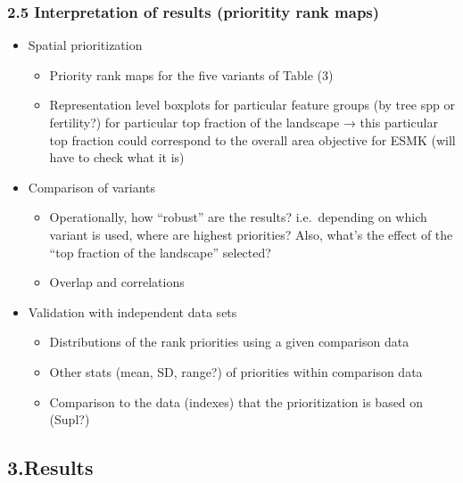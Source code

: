 \documentclass[]{article}
\begin{document}
\subsubsection{2.5 Interpretation of results (prioritity rank maps)}

\begin{itemize}
\itemsep1pt\parskip0pt
\item
  Spatial prioritization

  \begin{itemize}
  \itemsep1pt\parskip0pt
  \item
    Priority rank maps for the five variants of Table (3)
  \item
    Representation level boxplots for particular feature groups (by tree
    spp or fertility?) for particular top fraction of the landscape →
    this particular top fraction could correspond to the overall area
    objective for ESMK (will have to check what it is)
  \end{itemize}
\item
  Comparison of variants

  \begin{itemize}
  \itemsep1pt\parskip0pt
  \item
    Operationally, how ``robust'' are the results? i.e.~depending on
    which variant is used, where are highest priorities? Also, what's
    the effect of the ``top fraction of the landscape'' selected?
  \item
    Overlap and correlations
  \end{itemize}
\item
  Validation with independent data sets

  \begin{itemize}
  \itemsep1pt\parskip0pt
  \item
    Distributions of the rank priorities using a given comparison data
  \item
    Other stats (mean, SD, range?) of priorities within comparison data
  \item
    Comparison to the data (indexes) that the prioritization is based on
    (Supl?)
  \end{itemize}
\end{itemize}

\subsection{3.Results}
\end{document}
